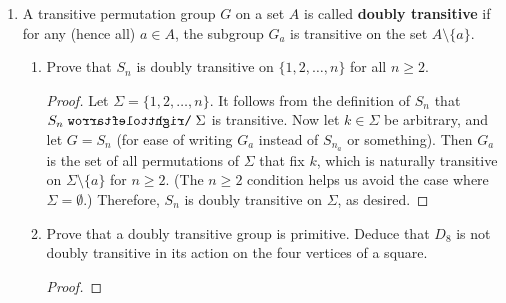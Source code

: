 \documentclass[../psets.tex]{subfiles}
\begin{document}
\begin{enumerate}
\begin{enumerate}[label={\textbf{\arabic*.}}]
\begin{enumerate}[label={\textbf{(\alph*)}}]
\begin{proof}
                Now suppose that for each $a\in A$, the $G_a$ is a maximal subgroup of $G$. To prove that (the transitive group) $G$ is primitive on $A$, it will suffice to show that the only blocks in $A$ are the trivial ones. Let $B$ be an arbitrary block in $A$. Pick an $a\in B$. By part (a), $G_a\leq G_B\leq G$. It follows by the hypothesis that $G_a$ is maximal that $G_B=G_a$ or $G_B=G$. We now divide into two cases. If $G_B=G_a$, suppose for the sake of contradiction that there exists $b\neq a$ in $B$. Since $G\acts A$ is transitive, there exists $\sigma\in G$ such that $\sigma(a)=b$. It follows since $B$ is a block that $\sigma(B)=B$, hence $\sigma\in G_B=G_a$. But this implies that $\sigma(a)=a$, a contradiction. Therefore, $B=\{a\}$. On the other hand, if $G_B=G$, then let $a\in A$ be arbitrary. By transitivity, there once again exists $\sigma\in G$ such that $\sigma\cdot b=a$ for some $b\in B$. But since $G=G_B$, $\sigma(B)=B$, so $a\in B$. Therefore, $A\subset B$, so $B=A$, as desired.
            \end{proof}
        \end{enumerate}
        \item A transitive permutation group $G$ on a set $A$ is called \textbf{doubly transitive} if for any (hence all) $a\in A$, the subgroup $G_a$ is transitive on the set $A\setminus\{a\}$.
        \begin{enumerate}[label={\textbf{(\alph*)}}]
            \item Prove that $S_n$ is doubly transitive on $\{1,2,\dots,n\}$ for all $n\geq 2$.
            \begin{proof}
                Let $\Sigma=\{1,2,\dots,n\}$. It follows from the definition of $S_n$ that $S_n\acts\Sigma$ is transitive. Now let $k\in\Sigma$ be arbitrary, and let $G=S_n$ (for ease of writing $G_a$ instead of $S_{n_a}$ or something). Then $G_a$ is the set of all permutations of $\Sigma$ that fix $k$, which is naturally transitive on $\Sigma\setminus\{a\}$ for $n\geq 2$. (The $n\geq 2$ condition helps us avoid the case where $\Sigma=\emptyset$.) Therefore, $S_n$ is doubly transitive on $\Sigma$, as desired.
            \end{proof}
            \item Prove that a doubly transitive group is primitive. Deduce that $D_8$ is not doubly transitive in its action on the four vertices of a square.
            \begin{proof}

\end{proof}
\end{enumerate}
\end{enumerate}
\end{enumerate}
\end{document}
